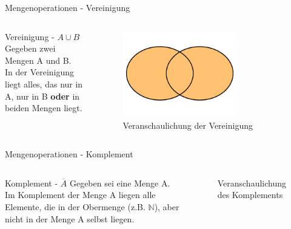 \begin{frame}{Mengenoperationen - Vereinigung}
    \begin{columns}
        \begin{alertblock}{Vereinigung - $A\cup B$}
            Gegeben zwei Mengen A und B.\\
            In der Vereinigung liegt alles, das nur in A, nur in B \textbf{oder} in beiden Mengen liegt.
        \end{alertblock}
        \begin{figure}
            \centering
            \includegraphics[width=0.7\textwidth]{../figures/AoderB.png}
            \caption{Veranschaulichung der Vereinigung}
            \label{fig:my_label}
        \end{figure}
    \end{columns}
\end{frame}

\begin{frame}{Mengenoperationen - Komplement}
    \begin{columns}
        \begin{alertblock}{Komplement - $\overline{A}$}
            Gegeben sei eine Menge A.\\
            Im Komplement der Menge A liegen alle Elemente, die in der Obermenge (z.B. $\mathbb{N}$), aber nicht in der Menge A selbst liegen.
        \end{alertblock}
        \begin{figure}
            \centering
            
            \caption{Veranschaulichung des Komplements}
            \label{fig:komplement}
        \end{figure}
    \end{columns}
\end{frame}

